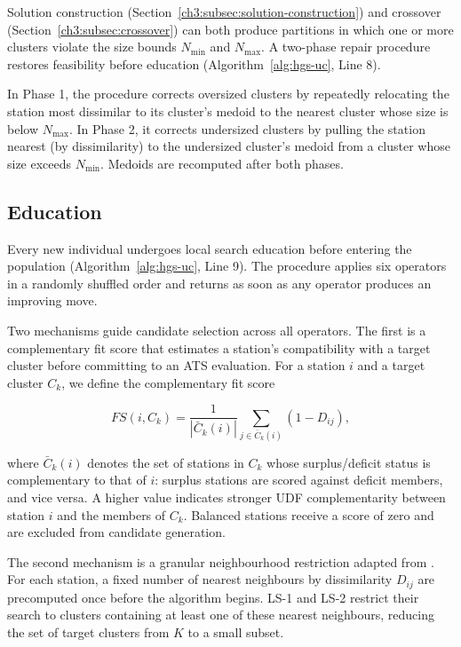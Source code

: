 Solution construction (Section~\ref{ch3:subsec:solution-construction}) and crossover (Section~\ref{ch3:subsec:crossover}) can both produce partitions in which one or more clusters violate the size bounds ${{N}_{\min }}$ and ${{N}_{\max }}$. A two-phase repair procedure restores feasibility before education (Algorithm~\ref{alg:hgs-uc}, Line 8).

In Phase 1, the procedure corrects oversized clusters by repeatedly relocating the station most dissimilar to its cluster's medoid to the nearest cluster whose size is below ${{N}_{\max }}$. In Phase 2, it corrects undersized clusters by pulling the station nearest (by dissimilarity) to the undersized cluster's medoid from a cluster whose size exceeds ${{N}_{\min }}$. Medoids are recomputed after both phases.

\subsection{Education}\label{ch3:subsec:education}

Every new individual undergoes local search education before entering the population (Algorithm~\ref{alg:hgs-uc}, Line 9). The procedure applies six operators in a randomly shuffled order and returns as soon as any operator produces an improving move.

Two mechanisms guide candidate selection across all operators. The first is a complementary fit score that estimates a station's compatibility with a target cluster before committing to an ATS evaluation. For a station $i$ and a target cluster ${{C}_{k}}$, we define the complementary fit score

\begin{equation}
FS(i,{{C}_{k}})=\frac{1}{|{{{\bar{C}}}_{k}}(i)|}\sum\limits_{j\in {{{\bar{C}}}_{k}}(i)}{(1-{{D}_{ij}})},
\end{equation}

where ${{\bar{C}}_{k}}(i)$ denotes the set of stations in ${{C}_{k}}$ whose surplus/deficit status is complementary to that of $i$: surplus stations are scored against deficit members, and vice versa. A higher value indicates stronger UDF complementarity between station $i$ and the members of ${{C}_{k}}$. Balanced stations receive a score of zero and are excluded from candidate generation.

The second mechanism is a granular neighbourhood restriction adapted from \citet{vidalHybridGeneticSearch2022}. For each station, a fixed number of nearest neighbours by dissimilarity ${{D}_{ij}}$ are precomputed once before the algorithm begins. LS-1 and LS-2 restrict their search to clusters containing at least one of these nearest neighbours, reducing the set of target clusters from $K$ to a small subset.

